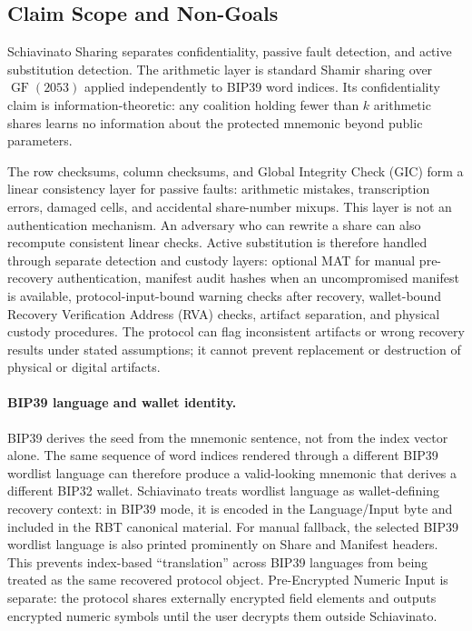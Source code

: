 \documentclass[11pt]{article}
\newcommand{\GF}{\operatorname{GF}}
\begin{document}
\subsection{Claim Scope and Non-Goals}
\label{sec:claim-scope}

Schiavinato Sharing separates confidentiality, passive fault detection, and active substitution detection. The arithmetic layer is standard Shamir sharing over $\GF(2053)$ applied independently to BIP39 word indices. Its confidentiality claim is information-theoretic: any coalition holding fewer than $k$ arithmetic shares learns no information about the protected mnemonic beyond public parameters.

The row checksums, column checksums, and Global Integrity Check (GIC) form a linear consistency layer for passive faults: arithmetic mistakes, transcription errors, damaged cells, and accidental share-number mixups. This layer is not an authentication mechanism. An adversary who can rewrite a share can also recompute consistent linear checks. Active substitution is therefore handled through separate detection and custody layers: optional MAT for manual pre-recovery authentication, manifest audit hashes when an uncompromised manifest is available, protocol-input-bound warning checks after recovery, wallet-bound Recovery Verification Address (RVA) checks, artifact separation, and physical custody procedures. The protocol can flag inconsistent artifacts or wrong recovery results under stated assumptions; it cannot prevent replacement or destruction of physical or digital artifacts.

\paragraph{BIP39 language and wallet identity.} BIP39 derives the seed from the mnemonic sentence, not from the index vector alone. The same sequence of word indices rendered through a different BIP39 wordlist language can therefore produce a valid-looking mnemonic that derives a different BIP32 wallet. Schiavinato treats wordlist language as wallet-defining recovery context: in BIP39 mode, it is encoded in the Language/Input byte and included in the RBT canonical material. For manual fallback, the selected BIP39 wordlist language is also printed prominently on Share and Manifest headers. This prevents index-based ``translation'' across BIP39 languages from being treated as the same recovered protocol object. Pre-Encrypted Numeric Input is separate: the protocol shares externally encrypted field elements and outputs encrypted numeric symbols until the user decrypts them outside Schiavinato.
\end{document}

